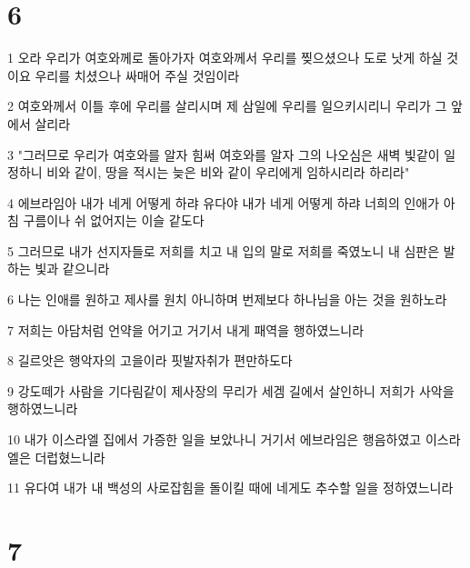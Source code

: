 \chapter{6}

\par 1 오라 우리가 여호와께로 돌아가자 여호와께서 우리를 찢으셨으나 도로 낫게 하실 것이요 우리를 치셨으나 싸매어 주실 것임이라
\par 2 여호와께서 이틀 후에 우리를 살리시며 제 삼일에 우리를 일으키시리니 우리가 그 앞에서 살리라
\par 3 "그러므로 우리가 여호와를 알자 힘써 여호와를 알자 그의 나오심은 새벽 빛같이 일정하니 비와 같이, 땅을 적시는 늦은 비와 같이 우리에게 임하시리라 하리라"
\par 4 에브라임아 내가 네게 어떻게 하랴 유다야 내가 네게 어떻게 하랴 너희의 인애가 아침 구름이나 쉬 없어지는 이슬 같도다
\par 5 그러므로 내가 선지자들로 저희를 치고 내 입의 말로 저희를 죽였노니 내 심판은 발하는 빛과 같으니라
\par 6 나는 인애를 원하고 제사를 원치 아니하며 번제보다 하나님을 아는 것을 원하노라
\par 7 저희는 아담처럼 언약을 어기고 거기서 내게 패역을 행하였느니라
\par 8 길르앗은 행악자의 고을이라 핏발자취가 편만하도다
\par 9 강도떼가 사람을 기다림같이 제사장의 무리가 세겜 길에서 살인하니 저희가 사악을 행하였느니라
\par 10 내가 이스라엘 집에서 가증한 일을 보았나니 거기서 에브라임은 행음하였고 이스라엘은 더럽혔느니라
\par 11 유다여 내가 내 백성의 사로잡힘을 돌이킬 때에 네게도 추수할 일을 정하였느니라

\chapter{7}


